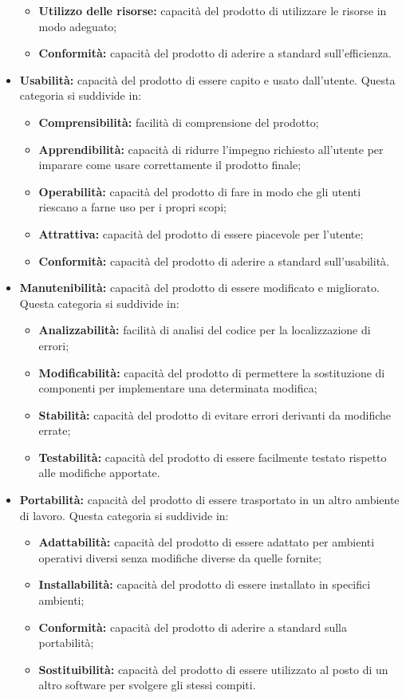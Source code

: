 \documentclass{scalatekids-article}
\begin{document}
\begin{itemize}
\begin{itemize}
      \item{\textbf{Utilizzo delle risorse:} capacità del prodotto di utilizzare le risorse in modo adeguato;}
      \item{\textbf{Conformità:} capacità del prodotto di aderire a standard sull'efficienza.}
    \end{itemize}
  \item{\textbf{Usabilità:} capacità del prodotto di essere capito e usato dall'utente. Questa categoria si suddivide in:}
    \begin{itemize}
      \item{\textbf{Comprensibilità:} facilità di comprensione del prodotto;}
      \item{\textbf{Apprendibilità:} capacità di ridurre l'impegno richiesto all'utente per imparare come usare correttamente il prodotto finale;}
      \item{\textbf{Operabilità:} capacità del prodotto di fare in modo che gli utenti riescano a farne uso per i propri scopi;}
      \item{\textbf{Attrattiva:} capacità del prodotto di essere piacevole per l'utente;}
      \item{\textbf{Conformità:} capacità del prodotto di aderire a standard sull'usabilità.}
    \end{itemize}
  \item{\textbf{Manutenibilità:} capacità del prodotto di essere modificato e migliorato. Questa categoria si suddivide in:}
    \begin{itemize}
      \item{\textbf{Analizzabilità:} facilità di analisi del codice per la localizzazione di errori;}
      \item{\textbf{Modificabilità:} capacità del prodotto di permettere la sostituzione di componenti per implementare una determinata modifica;}
      \item{\textbf{Stabilità:} capacità del prodotto di evitare errori derivanti da modifiche errate;}
      \item{\textbf{Testabilità:} capacità del prodotto di essere facilmente testato rispetto alle modifiche apportate.}
    \end{itemize}
  \item{\textbf{Portabilità:} capacità del prodotto di essere trasportato in un altro ambiente di lavoro. Questa categoria si suddivide in:}
    \begin{itemize}
      \item{\textbf{Adattabilità:} capacità del prodotto di essere adattato per ambienti operativi diversi senza modifiche diverse da quelle fornite;}
      \item{\textbf{Installabilità:} capacità del prodotto di essere installato in specifici ambienti;}
      \item{\textbf{Conformità:} capacità del prodotto di aderire a standard sulla portabilità;}
      \item{\textbf{Sostituibilità:} capacità del prodotto di essere utilizzato al posto di un altro software per svolgere gli stessi compiti.}
    \end{itemize}
\end{itemize}
\newpage
\end{document}
